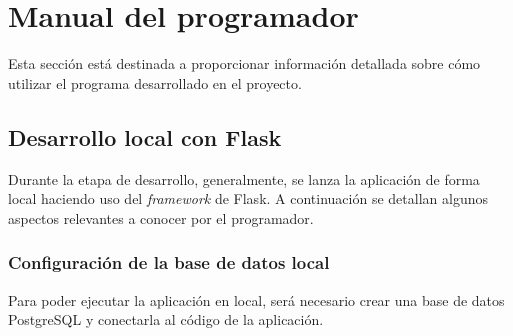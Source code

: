 
\section{Manual del programador}

Esta sección está destinada a proporcionar información detallada sobre cómo utilizar el programa desarrollado en el proyecto.

\subsection{Desarrollo local con Flask}
Durante la etapa de desarrollo, generalmente, se lanza la aplicación de forma local haciendo uso del \textit{framework} de Flask. A continuación se detallan algunos aspectos relevantes a conocer por el programador.

\subsubsection{Configuración de la base de datos local}
Para poder ejecutar la aplicación en local, será necesario crear una base de datos PostgreSQL y conectarla al código de la aplicación.

